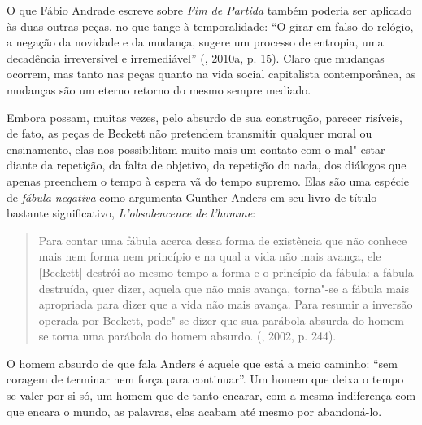 O que Fábio Andrade escreve sobre \emph{Fim de Partida} também poderia
ser aplicado às duas outras peças, no que tange à temporalidade: ``O
girar em falso do relógio, a negação da novidade e da mudança, sugere um
processo de entropia, uma decadência irreversível e irremediável''
(, 2010a, p. 15). Claro que mudanças ocorrem, mas tanto nas peças
quanto na vida social capitalista contemporânea, as mudanças são um
eterno retorno do mesmo sempre mediado.

Embora possam, muitas vezes, pelo absurdo de sua construção, parecer
risíveis, de fato, as peças de Beckett não pretendem transmitir qualquer
moral ou ensinamento, elas nos possibilitam muito mais um contato com o
mal"-estar diante da repetição, da falta de objetivo, da repetição do
nada, dos diálogos que apenas preenchem o tempo à espera vã do tempo
supremo. Elas são uma espécie de \emph{fábula negativa} como argumenta
Gunther Anders em seu livro de título bastante significativo,
\emph{L'obsolencence de l'homme}:

\begin{quote}
Para contar uma fábula acerca dessa forma de existência que não conhece
mais nem forma nem princípio e na qual a vida não mais avança, ele
[Beckett] destrói ao mesmo tempo a forma e o princípio da fábula: a
fábula destruída, quer dizer, aquela que não mais avança, torna"-se a
fábula mais apropriada para dizer que a vida não mais avança. Para
resumir a inversão operada por Beckett, pode"-se dizer que sua parábola
absurda do homem se torna uma parábola do homem absurdo. (, 2002,
p. 244).
\end{quote}

O homem absurdo de que fala Anders é aquele que está a meio caminho:
``sem coragem de terminar nem força para continuar''. Um homem que deixa
o tempo se valer por si só, um homem que de tanto encarar, com a mesma
indiferença com que encara o mundo, as palavras, elas acabam até mesmo
por abandoná-lo.


